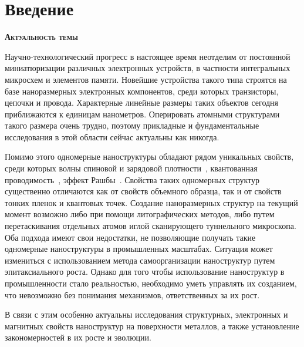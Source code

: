 \chapter*{Введение}
\label{chap:introduction}

\newcommand{\psection}[1]{\vspace*{0.3cm}\textsc{\bfseries{#1}}\par}
\newcommand{\compenspace}{\vspace*{-0.3cm}}

\compenspace

\psection{Актуальность темы}
Научно-технологический прогресс в настоящее время неотделим от постоянной миниатюризации различных электронных устройств, в частности интегральных микросхем и элементов памяти.
Новейшие устройства такого типа строятся на базе наноразмерных электронных компонентов, среди которых транзисторы, цепочки и провода.
Характерные линейные размеры таких объектов сегодня приближаются к единицам нанометров. Оперировать атомными структурами такого размера очень трудно, поэтому прикладные и фундаментальные исследования в этой области сейчас актуальны как никогда.

Помимо этого одномерные наноструктуры обладают рядом уникальных свойств, среди которых волны спиновой и зарядовой плотности~\cite{Erwin2010}, квантованная проводимость~\cite{Klavsyuk2015}, эффект Рашбы~\cite{Rasba84.1}.
Свойства таких одномерных структур существенно отличаются как от свойств объемного образца, так и от свойств тонких пленок и квантовых точек.
Создание наноразмерных структур на текущий момент возможно либо при помощи литографических методов, либо путем перетаскивания отдельных атомов иглой сканирующего туннельного микроскопа.
Оба подхода имеют свои недостатки, не позволяющие получать такие одномерные наноструктуры в промышленных масштабах.
Ситуация может измениться с использованием метода самоорганизации наноструктур путем эпитаксиального роста.
Однако для того чтобы использование наноструктур в промышленности стало реальностью, необходимо уметь управлять их созданием, что невозможно без понимания механизмов, ответственных за их рост.

В связи с этим особенно актуальны исследования структурных, электронных и магнитных свойств наноструктур на поверхности металлов, а также установление закономерностей в их росте и эволюции.


